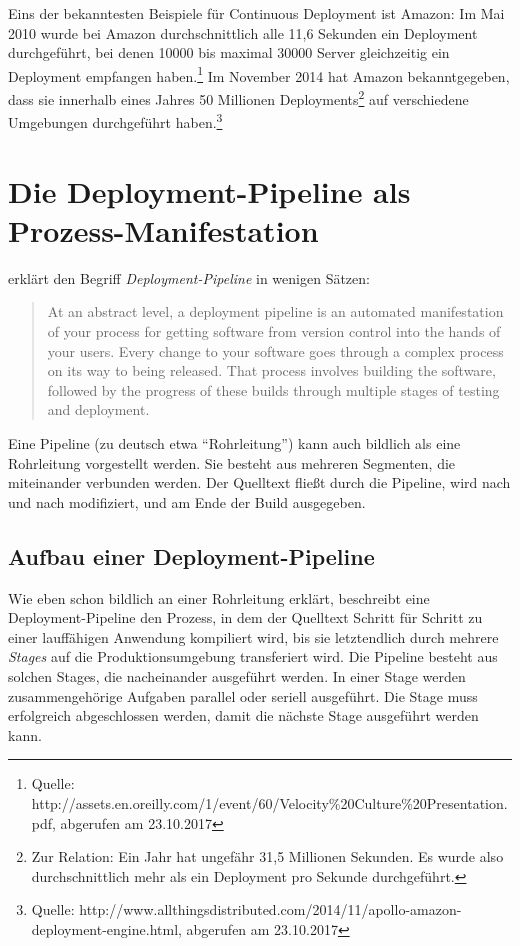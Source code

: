 Eins der bekanntesten Beispiele für Continuous Deployment ist Amazon: Im Mai 2010 wurde bei Amazon durchschnittlich alle 11,6 Sekunden ein Deployment durchgeführt, bei denen 10000 bis maximal 30000 Server gleichzeitig ein Deployment empfangen haben.\footnote{Quelle: http://assets.en.oreilly.com/1/event/60/Velocity\%20Culture\%20Presentation.pdf, abgerufen am 23.10.2017} Im November 2014 hat Amazon bekanntgegeben, dass sie innerhalb eines Jahres 50 Millionen Deployments\footnote{Zur Relation: Ein Jahr hat ungefähr 31,5 Millionen Sekunden. Es wurde also durchschnittlich mehr als ein Deployment pro Sekunde durchgeführt.} auf verschiedene Umgebungen durchgeführt haben.\footnote{Quelle: http://www.allthingsdistributed.com/2014/11/apollo-amazon-deployment-engine.html, abgerufen am 23.10.2017}

\section{Die Deployment-Pipeline als Prozess-Manifestation}
\label{sec:deployment-pipeline}

\citet[106]{Humble2010} erklärt den Begriff \emph{Deployment-Pipeline} in wenigen Sätzen:

\begin{quote}
 At an abstract level, a deployment pipeline is an automated manifestation of your process for getting software from version control into the hands of your users. Every change to your software goes through a complex process on its way to being released. That process involves building the software, followed by the progress of these builds through multiple stages of testing and deployment.
\end{quote}

Eine Pipeline (zu deutsch etwa ``Rohrleitung'') kann auch bildlich als eine Rohrleitung vorgestellt werden. Sie besteht aus mehreren Segmenten, die miteinander verbunden werden. Der Quelltext fließt durch die Pipeline, wird nach und nach modifiziert, und am Ende der Build ausgegeben.

\subsection{Aufbau einer Deployment-Pipeline}

Wie eben schon bildlich an einer Rohrleitung erklärt, beschreibt eine Deployment-Pipeline den Prozess, in dem der Quelltext Schritt für Schritt zu einer lauffähigen Anwendung kompiliert wird, bis sie letztendlich durch mehrere \emph{Stages} auf die Produktionsumgebung transferiert wird. Die Pipeline besteht aus solchen Stages, die nacheinander ausgeführt werden. In einer Stage werden zusammengehörige Aufgaben parallel oder seriell ausgeführt. Die Stage muss erfolgreich abgeschlossen werden, damit die nächste Stage ausgeführt werden kann.

